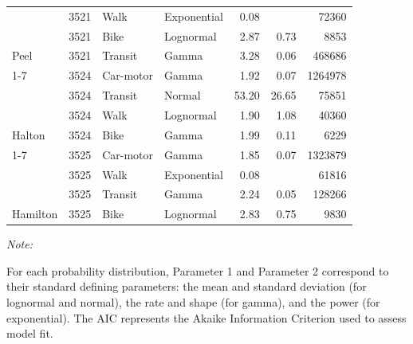\documentclass[preprint, 3p,
authoryear]{elsarticle} %
\begin{document}
\begin{table}[H]
{\begin{threeparttable}
\begin{tabular}[t]{lrllrrr}
 & 3521 & Walk & Exponential & 0.08 &  & 72360\\

 & 3521 & Bike & Lognormal & 2.87 & 0.73 & 8853\\

\multirow[t]{-4}{*}{\raggedright\arraybackslash Peel} & 3521 & Transit & Gamma & 3.28 & 0.06 & 468686\\
\cmidrule{1-7}
 & 3524 & Car-motor & Gamma & 1.92 & 0.07 & 1264978\\

 & 3524 & Transit & Normal & 53.20 & 26.65 & 75851\\

 & 3524 & Walk & Lognormal & 1.90 & 1.08 & 40360\\

\multirow[t]{-4}{*}{\raggedright\arraybackslash Halton} & 3524 & Bike & Gamma & 1.99 & 0.11 & 6229\\
\cmidrule{1-7}
 & 3525 & Car-motor & Gamma & 1.85 & 0.07 & 1323879\\

 & 3525 & Walk & Exponential & 0.08 &  & 61816\\

 & 3525 & Transit & Gamma & 2.24 & 0.05 & 128266\\

\multirow[t]{-4}{*}{\raggedright\arraybackslash Hamilton} & 3525 & Bike & Lognormal & 2.83 & 0.75 & 9830\\
\bottomrule
\end{tabular}
\begin{tablenotes}
\item \textit{Note: } 
\item For each probability distribution, Parameter 1 and Parameter 2 correspond to their standard defining parameters: the mean and standard deviation (for lognormal and normal), the rate and shape (for gamma), and the power (for exponential). The AIC represents the Akaike Information Criterion used to assess model fit.
\end{tablenotes}
\end{threeparttable}}
\end{table}

\renewcommand{\thetable}{A.2}
\end{document}
